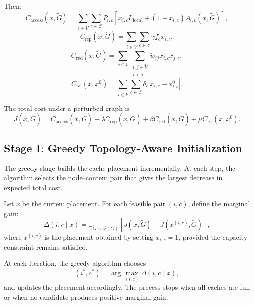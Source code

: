 Then:
\[
C_{\text{access}}(x,\tilde{G})
=
\sum_{i \in \tilde{V}} \sum_{c \in \mathcal{C}}
P_{i,c}
\left[
x_{i,c}L_{\text{local}}
+
(1-x_{i,c})A_{i,c}(x,\tilde{G})
\right],
\]
\[
C_{\text{rep}}(x,\tilde{G})
=
\sum_{i \in \tilde{V}} \sum_{c \in \mathcal{C}}
\gamma f_c x_{i,c},
\]
\[
C_{\text{red}}(x,\tilde{G})
=
\sum_{c \in \mathcal{C}}
\sum_{\substack{i,j \in \tilde{V} \\ i<j}}
\tilde{w}_{ij}x_{i,c}x_{j,c},
\]
\[
C_{\text{rel}}(x,x^0)
=
\sum_{i \in \tilde{V}} \sum_{c \in \mathcal{C}}
\delta_c |x_{i,c}-x_{i,c}^0|.
\]

The total cost under a perturbed graph is
\[
J(x,\tilde{G})
=
C_{\text{access}}(x,\tilde{G})
+
\lambda C_{\text{rep}}(x,\tilde{G})
+
\beta C_{\text{red}}(x,\tilde{G})
+
\mu C_{\text{rel}}(x,x^0).
\]

\subsection{Stage I: Greedy Topology-Aware Initialization}

The greedy stage builds the cache placement incrementally. At each step, the algorithm selects the node--content pair that gives the largest decrease in expected total cost.

Let \(x\) be the current placement. For each feasible pair \((i,c)\), define the marginal gain:
\[
\Delta(i,c \mid x)
=
\mathbb{E}_{\tilde{G} \sim \mathcal{P}(G)}
\left[
J(x,\tilde{G}) - J(x^{(i,c)},\tilde{G})
\right],
\]
where \(x^{(i,c)}\) is the placement obtained by setting \(x_{i,c}=1\), provided the capacity constraint remains satisfied.

At each iteration, the greedy algorithm chooses
\[
(i^*,c^*) = \arg\max_{(i,c)} \Delta(i,c \mid x),
\]
and updates the placement accordingly. The process stops when all caches are full or when no candidate produces positive marginal gain.

